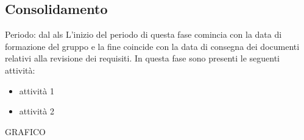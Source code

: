 \subsection{Consolidamento}
Periodo: dal als
L'inizio del periodo di questa fase comincia con la data di formazione del gruppo e la fine coincide con la data di consegna dei documenti relativi alla revisione dei requisiti. In questa fase sono presenti le seguenti attività:
\begin{itemize}
\item attività 1
\item attività 2
\end{itemize}

GRAFICO